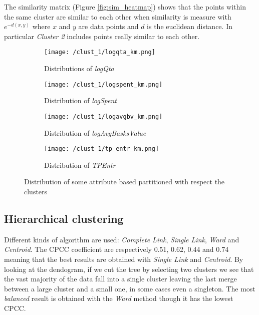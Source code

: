 \documentclass{article}
\begin{document}
The similarity matrix (Figure \ref{fig:sim_heatmap}) shows that the points within the same cluster are similar to each other when similarity is measure with $e^{-d(x, y)}$ where $x$ and $y$ are data points and $d$ is the euclidean distance. In particular \emph{Cluster 2} includes points really similar to each other.

\begin{figure}[h!]
    \centering
    \begin{subfigure}{0.49\textwidth}
        \texttt{[image: /clust\_1/logqta\_km.png]}
        \caption{Distributions of \emph{logQta}}
        \label{fig:logqta}
    \end{subfigure}
    \begin{subfigure}{0.49\textwidth}
        \centering
        \texttt{[image: /clust\_1/logspent\_km.png]}
        \caption{Distribution of \emph{logSpent}}
        \label{fig:logspent}

    \end{subfigure}
        \begin{subfigure}{0.49\textwidth}
        \centering
        \texttt{[image: /clust\_1/logavgbv\_km.png]}
        \caption{Distribution of \emph{logAvgBasksValue}}
        \label{fig:logavgbv}
    \end{subfigure}
        \begin{subfigure}{0.49\textwidth}
        \centering
        \texttt{[image: /clust\_1/tp\_entr\_km.png]}
        \caption{Distribution of \emph{TPEntr}}
        \label{fig:tpentr}
    \end{subfigure}
    \caption{Distribution of some attribute based partitioned with respect the clusters}
\end{figure}
\newpage
\subsection{Hierarchical clustering}
Different kinds of algorithm are used: \emph{Complete Link}, \emph{Single Link}, \emph{Ward} and \emph{Centroid}. The CPCC coefficient are respectively 0.51, 0.62, 0.44 and 0.74 meaning that the best results are obtained with \emph{Single Link} and \emph{Centroid}. By looking at the dendogram, if we cut the tree by selecting two clusters we see that the vast majority of the data fall into a single cluster leaving the last merge between a large cluster and a small one, in some cases even a singleton. The most \emph{balanced} result is obtained with the \emph{Ward} method though it has the lowest CPCC.
\end{document}
